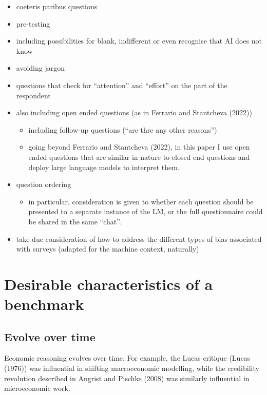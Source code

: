 \documentclass[
]{article}
\providecommand{\tightlist}{%
  \setlength{\itemsep}{0pt}\setlength{\parskip}{0pt}}\usepackage{longtable,booktabs,array}
\begin{document}
\begin{itemize}
\tightlist
\item
  coeteris paribus questions
\item
  pre-testing
\item
  including possibilities for blank, indifferent or even recognise that
  AI does not know
\item
  avoiding jargon
\item
  questions that check for ``attention'' and ``effort'' on the part of
  the respondent
\item
  also including open ended questions (as in Ferrario and Stantcheva
  (2022))

  \begin{itemize}
  \tightlist
  \item
    including follow-up questions (``are thre any other reasons'')
  \item
    going beyond Ferrario and Stantcheva (2022), in this paper I use
    open ended questions that are similar in nature to closed end
    questions and deploy large language models to interpret them.
  \end{itemize}
\item
  question ordering

  \begin{itemize}
  \tightlist
  \item
    in particular, consideration is given to whether each question
    should be presented to a separate instance of the LM, or the full
    questionnaire could be shared in the same ``chat''.
  \end{itemize}
\item
  take due consideration of how to address the different types of bias
  associated with surveys (adapted for the machine context, naturally)
\end{itemize}

\section{Desirable characteristics of a
benchmark}\label{desirable-characteristics-of-a-benchmark}

\subsection{Evolve over time}\label{evolve-over-time}

Economic reasoning evolves over time. For example, the Lucas critique
(Lucas (1976)) was influential in shifting macroeconomic modelling,
while the credibility revolution described in Angrist and Pischke (2008)
was similarly influential in microeconomic work.
\end{document}
